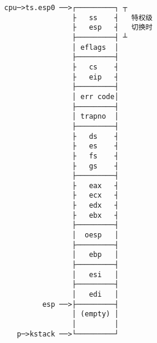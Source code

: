 \documentclass[varwidth,crop]{standalone}
\begin{document}
\begin{verbatim}
cpu─>ts.esp0 ──>┌─────────┐ ┬
                ├   ss    ┤   特权级
                ├   esp   ┤   切换时  
                ├─────────┤ ┴
                │ eflags  │ 
                ├─────────┤
                ├   cs    ┤
                ├   eip   ┤
                ├─────────┤
                │ err code│
                ├─────────┤
                │ trapno  │
                ├─────────┤
                ├   ds    ┤
                ├   es    ┤
                ├   fs    ┤
                ├   gs    ┤
                ├─────────┤
                ├   eax   ┤
                ├   ecx   ┤
                ├   edx   ┤
                ├   ebx   ┤
                ├─────────┤
                │  oesp   │
                ├─────────┤
                │   ebp   │
                ├─────────┤
                │   esi   │
                ├─────────┤
                │   edi   │
         esp ──>├─────────┤
                │ (empty) │
                │         │
   p─>kstack ──>└─────────┘
\end{verbatim}
\end{document}
